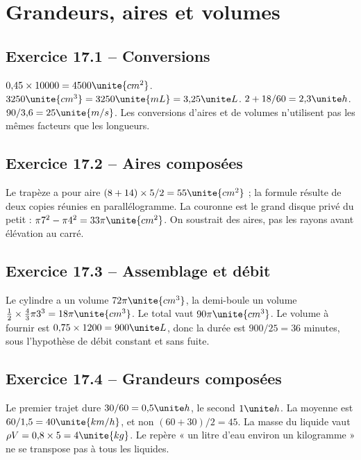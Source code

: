 \chapter{Grandeurs, aires et volumes}
\label{corriges:17}
\section*{Exercice 17.1 -- Conversions}
$0{,}45\times10000=4500\unite{cm^2}$.
$3250\unite{cm^3}=3250\unite{mL}=3{,}25\unite L$.
$2+18/60=2{,}3\unite h$.
$90/3{,}6=25\unite{m/s}$.
Les conversions d'aires et de volumes n'utilisent pas les mêmes facteurs que les longueurs.

\section*{Exercice 17.2 -- Aires composées}
Le trapèze a pour aire $(8+14)\times5/2=55\unite{cm^2}$ ; la formule résulte de deux copies réunies en parallélogramme. La couronne est le grand disque privé du petit : $\pi7^2-\pi4^2=33\pi\unite{cm^2}$. On soustrait des aires, pas les rayons avant élévation au carré.

\section*{Exercice 17.3 -- Assemblage et débit}
Le cylindre a un volume $72\pi\unite{cm^3}$, la demi-boule un volume $\frac12\times\frac43\pi3^3=18\pi\unite{cm^3}$. Le total vaut $90\pi\unite{cm^3}$.
Le volume à fournir est $0{,}75\times1200=900\unite L$, donc la durée est $900/25=36$ minutes, sous l'hypothèse de débit constant et sans fuite.

\section*{Exercice 17.4 -- Grandeurs composées}
Le premier trajet dure $30/60=0{,}5\unite h$, le second $1\unite h$. La moyenne est $60/1{,}5=40\unite{km/h}$, et non $(60+30)/2=45$. La masse du liquide vaut $\rho V=0{,}8\times5=4\unite{kg}$. Le repère « un litre d'eau environ un kilogramme » ne se transpose pas à tous les liquides.

